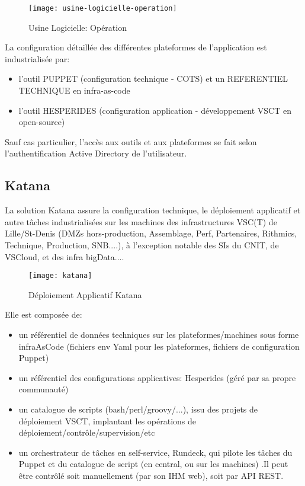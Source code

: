 \begin{figure}[ht]
 \centering
 \texttt{[image: usine-logicielle-operation]}
 \caption{Usine Logicielle: Opération}
\end{figure}

La configuration détaillée des différentes plateformes de l'application est industrialisée par:
\begin{itemize}
 \item l'outil PUPPET (configuration technique - COTS) et un REFERENTIEL TECHNIQUE en infra-as-code
 \item l'outil HESPERIDES (configuration application - développement VSCT en open-source)
\end{itemize}

Sauf cas particulier, l'accès aux outils et aux plateformes se fait selon l'authentification Active Directory de l'utilisateur.
\subsection{Katana}

La solution Katana assure la configuration technique, le déploiement applicatif et autre tâches industrialisées sur les machines des infrastructures VSC(T) de Lille/St-Denis (DMZs hors-production, Assemblage, Perf, Partenaires, Rithmics, Technique, Production, SNB....), à l'exception notable des SIs du CNIT, de VSCloud, et des infra bigData....

\begin{figure}[ht]
 \centering
 \texttt{[image: katana]}
 \caption{Déploiement Applicatif Katana}
\end{figure}

Elle est composée de:

\begin{itemize}
 \item un référentiel de données techniques sur les plateformes/machines sous forme infraAsCode (fichiers env Yaml pour les plateformes, fichiers de configuration Puppet)
 \item un référentiel des configurations applicatives: Hesperides (géré par sa propre communauté)
 \item un catalogue de scripts (bash/perl/groovy/...), issu des projets de déploiement VSCT, implantant les opérations de déploiement/contrôle/supervision/etc
 \item un orchestrateur de tâches en self-service, Rundeck, qui pilote les tâches du Puppet et du catalogue de script (en central, ou sur les machines) .Il peut être contrôlé soit manuellement (par son IHM web), soit par API REST.
\end{itemize}

